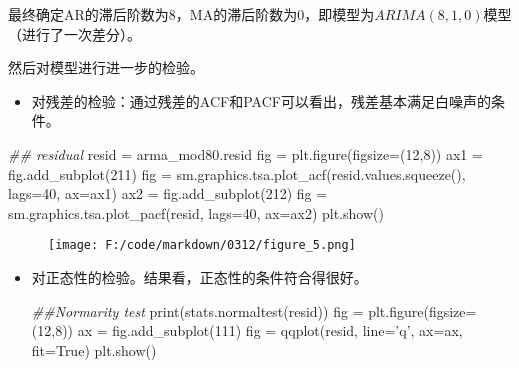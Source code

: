 \documentclass[]{article}
\newenvironment{Shaded}{}{}
\newcommand{\DecValTok}[1]{\textcolor[rgb]{0.25,0.63,0.44}{#1}}
\newcommand{\StringTok}[1]{\textcolor[rgb]{0.25,0.44,0.63}{#1}}
\newcommand{\CommentTok}[1]{\textcolor[rgb]{0.38,0.63,0.69}{\textit{#1}}}
\newcommand{\VariableTok}[1]{\textcolor[rgb]{0.10,0.09,0.49}{#1}}
\newcommand{\OperatorTok}[1]{\textcolor[rgb]{0.40,0.40,0.40}{#1}}
\newcommand{\BuiltInTok}[1]{#1}
\newcommand{\NormalTok}[1]{#1}
\begin{document}
最终确定AR的滞后阶数为8，MA的滞后阶数为0，即模型为\(ARIMA(8,1,0)\)模型（进行了一次差分）。

然后对模型进行进一步的检验。

\begin{itemize}
\item
  对残差的检验：通过残差的ACF和PACF可以看出，残差基本满足白噪声的条件。 
\end{itemize}

\begin{Shaded}
\begin{Highlighting}[]
\CommentTok{## residual}
\NormalTok{resid }\OperatorTok{=}\NormalTok{ arma_mod80.resid}
\NormalTok{fig }\OperatorTok{=}\NormalTok{ plt.figure(figsize}\OperatorTok{=}\NormalTok{(}\DecValTok{12}\NormalTok{,}\DecValTok{8}\NormalTok{))}
\NormalTok{ax1 }\OperatorTok{=}\NormalTok{ fig.add_subplot(}\DecValTok{211}\NormalTok{)}
\NormalTok{fig }\OperatorTok{=}\NormalTok{ sm.graphics.tsa.plot_acf(resid.values.squeeze(), lags}\OperatorTok{=}\DecValTok{40}\NormalTok{, ax}\OperatorTok{=}\NormalTok{ax1)}
\NormalTok{ax2 }\OperatorTok{=}\NormalTok{ fig.add_subplot(}\DecValTok{212}\NormalTok{)}
\NormalTok{fig }\OperatorTok{=}\NormalTok{ sm.graphics.tsa.plot_pacf(resid, lags}\OperatorTok{=}\DecValTok{40}\NormalTok{, ax}\OperatorTok{=}\NormalTok{ax2)}
\NormalTok{plt.show()}
\end{Highlighting}
\end{Shaded}

\begin{figure}
\centering
\texttt{[image: F:/code/markdown/0312/figure\_5.png]}
\caption{}
\end{figure}

\begin{itemize}
\item
  对正态性的检验。结果看，正态性的条件符合得很好。

\begin{Shaded}
\begin{Highlighting}[]
\CommentTok{##Normarity test}
\BuiltInTok{print}\NormalTok{(stats.normaltest(resid))}
\NormalTok{fig }\OperatorTok{=}\NormalTok{ plt.figure(figsize}\OperatorTok{=}\NormalTok{(}\DecValTok{12}\NormalTok{,}\DecValTok{8}\NormalTok{))}
\NormalTok{ax }\OperatorTok{=}\NormalTok{ fig.add_subplot(}\DecValTok{111}\NormalTok{)}
\NormalTok{fig }\OperatorTok{=}\NormalTok{ qqplot(resid, line}\OperatorTok{=}\StringTok{'q'}\NormalTok{, ax}\OperatorTok{=}\NormalTok{ax, fit}\OperatorTok{=}\VariableTok{True}\NormalTok{)}
\NormalTok{plt.show()}
\end{Highlighting}
\end{Shaded}
\end{itemize}
\end{document}
